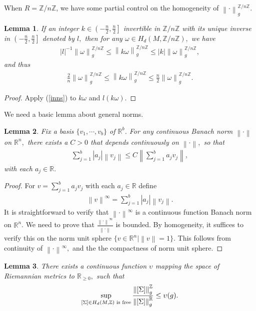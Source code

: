 \documentclass[11pt,a4paper]{amsart}
\numberwithin{equation}{section}
\newcommand{\om}{\omega}
\newcommand{\Si}{\Sigma}
\newcommand{\cd}{\cdots}
\newcommand{\no}[1]{\left\lVert#1\right\rVert}
\newcommand{\m}{^{-1}}
\newcommand{\R}{\mathbb{R}}
\newcommand{\Z}{\mathbb{Z}}
\theoremstyle{plain}
\newtheorem{lem}{Lemma}[subsection]
\theoremstyle{definition}
\numberwithin{equation}{subsection}
\begin{document}
	When $R=\Z/n\Z$, we have some partial control on the homogeneity of $\no{\cdot}_{g}^{\Z/n\Z}$.
	\begin{lem}\label{lemhn}
	If an integer $k\in \left(-\frac{n}{2},\frac{n}{2}\right]$ invertible in $\Z/n\Z$ with its unique inverse in 	$\left(-\frac{n}{2},\frac{n}{2}\right]$ denoted by $l,$ then for any $\om\in H_d(M,\Z/n\Z),$ we have
	\begin{align*}
		|l|\m \no{\om}_g^{\Z/n\Z}\le\no{k\om}_g^{\Z/n\Z}\le |k|\no{\om}_g^{\Z/n\Z},
	\end{align*}
	and thus
	\begin{align}\label{inhn}
		\frac{2}{n}\no{\om}_g^{\Z/n\Z}\le\no{k\om}_g^{\Z/n\Z}\le \frac{n}{2}\no{\om}_g^{\Z/n\Z}.
	\end{align}
	\end{lem}
	\begin{proof}
	Apply (\ref{inns}) to $k\om$ and $l(k\om)$.
	\end{proof}
	We need a basic lemma about general norms.
	\begin{lem}\label{lemnorm}
	Fix a basis $\{v_1,\cd,v_b\}$ of $\R^b$. For any continuous Banach norm $\no{\cdot}$ on $\R^n,$ there exists a $C>0$ that depends continuously on $\no{\cdot},$ so that 
	\begin{align*}
		\sum_{j=1}^b|a_j|\no{v_j}\le C \no{\sum_{j=1}^b a_jv_j},
	\end{align*}with each $a_j\in \R.$
	\end{lem}
	\begin{proof}
	For $v=\sum_{j=1}^b a_jv_j$ with each $a_j\in\R$ define
	\begin{align*}
		\no{v}^\infty=\sum_{j=1}^b|a_j|\no{v_j}.
	\end{align*}
	It is straightforward to verify that $\no{\cdot}^\infty$ is a continuous function Banach norm on $\R^n$. We need to prove that $\frac{\no{\cdot}^\infty}{\no{\cdot}}$ is bounded. By homogeneity, it suffices to verify this on the norm unit sphere $\{v\in \R^n|\no{v}=1\}.$ This follows from continuity of $\no{\cdot}^\infty,$ and the the compactness of norm unit sphere.
	\end{proof}
	\begin{lem}\label{lemmsbd}
	There exists a continuous function $\upsilon$ mapping the space of Riemannian metrics	to $\R_{\ge 0},$ such that  \begin{align*}
		\sup_{[\Si]\in H_d(M,\Z)\textnormal{ is free}}		\frac{\no{[\Si]}_g^{\Z}}{\no{[\Si]}_g^{\R}}\le \upsilon(g).
	\end{align*}
	\end{lem}
\end{document}
